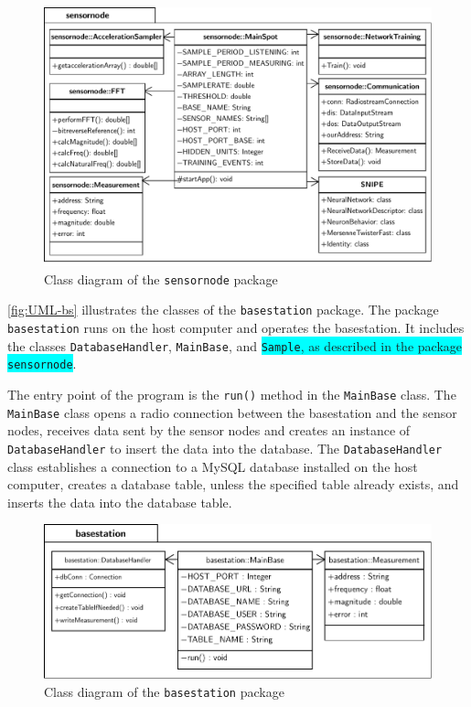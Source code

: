 \documentclass[12pt,a4paper]{scrartcl}
\begin{document}
\begin{figure}[htbp]
    \centering
    \includegraphics[width = \textwidth]{figures/uml-sensornode.pdf}
    \caption{Class diagram of the \texttt{sensornode} package}
    \label{fig:UML-sn}
\end{figure}

\autoref{fig:UML-bs} illustrates the classes of the \texttt{base\-station} package.
The package \texttt{base\-station} runs on the host computer and operates the basestation.
It includes the classes \texttt{Database\-Handler}, \texttt{Main\-Base}, and \colorbox{cyan}{\texttt{Sample}, as described in the package \texttt{sensornode}}.

The entry point of the program is the \texttt{run()} method in the \texttt{Main\-Base} class. 
The \texttt{Main\-Base} class opens a radio connection between the basestation and the sensor nodes, receives data sent by the sensor nodes and creates an instance of \texttt{Database\-Handler} to insert the data into the database.
The \texttt{Database\-Handler} class establishes a connection to a MySQL database installed on the host computer, creates a database table, unless the specified table already exists, and inserts the data into the database table.

\begin{figure}[htbp]
    \centering
    \includegraphics[width = \textwidth]{figures/uml-basestation.pdf}
    \caption{Class diagram of the \texttt{basestation} package}
    \label{fig:UML-bs}
\end{figure}
\end{document}

